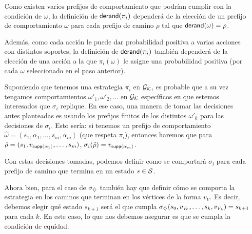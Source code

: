 Como existen varios prefijos de comportamiento que podrían cumplir con la
condición de $\omega$, la definición de $\textsf{derand}(\pi_i)$ dependerá de la
elección de un prefijo de comportamiento $\omega$ para cada prefijo de camino
$\rho$ tal que $\textsf{derand}(\omega) = \rho$.

Además, como cada acción le puede dar probabilidad positiva a varias acciones
con distintos soportes, la definición de $\textsf{derand}(\pi_i)$ también dependerá de
la elección de una acción a la que $\pi_i(\omega)$ le asigne una probabilidad
positiva (por cada $\omega$ seleccionado en el paso anterior).

\begin{boxgris}{}
	Suponiendo que tenemos una estrategia $\pi_i$ en $\mathcal{G}_{\mathcal{K}}$, es probable que a su vez tengamos comportamientos $\omega'_1, \omega'_2, \dots$ en $\mathcal{G}_{\mathcal{K}}$ específicos en que estemos interesados que $\sigma_i$ replique. En ese caso, una manera de tomar las decisiones antes planteadas es usando los prefijos finitos de los distintos $\omega'_k$ para las decisiones de $\sigma_i$. Esto sería: si tenemos un prefijo de comportamiento $\hat \omega = (s_1, \alpha_1, \dots, s_m, \alpha_m)$ (que respeta $\pi_i$), entonces haremos que para $\hat \rho = (s_1, v_{\textsf{supp}(\alpha_1)}, \dots, s_m)$, $\sigma_i(\hat \rho) = v_{\textsf{supp}(\alpha_m)}$.
\end{boxgris}

Con estas decisiones tomadas, podemos definir como se comportará $\sigma_i$
para cada prefijo de camino que termina en un estado $s \in \mathcal{S}$.

Ahora bien, para el caso de $\sigma_\diamondsuit$ también hay que definir cómo se
comporta la estrategia en los caminos que terminan en los vértices de la forma
$v_V$. Es decir, debemos elegir qué estado $s_{k+1}$ será el que cumpla
$\sigma_\diamondsuit(s_0, v_{V_0}, \dots, s_k, v_{V_k}) = s_{k+1}$ para cada $k$. En
este caso, lo que nos debemos asegurar es que se cumpla la condición de
equidad.

